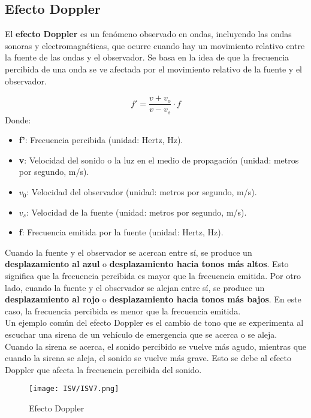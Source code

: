 \documentclass[
	12pt, %
	fleqn, %
	a4paper, %
	oneside, %
]{LegrandOrangeBook}
\begin{document}
\subsection{Efecto Doppler}
El \textbf{efecto Doppler} es un fenómeno observado en ondas, incluyendo las ondas sonoras y electromagnéticas, que ocurre cuando hay un movimiento relativo entre la fuente de las ondas y el observador. Se basa en la idea de que la frecuencia percibida de una onda se ve afectada por el movimiento relativo de la fuente y el observador.\\
\begin{definition}
\begin{equation}
f' = \frac{{v + v_o}}{{v - v_s}} \cdot f
\end{equation}
Donde:
\begin{itemize}
\item \textbf{f'}: Frecuencia percibida (unidad: Hertz, Hz).
\item \textbf{v}: Velocidad del sonido o la luz en el medio de propagación (unidad: metros por segundo, m/s).
\item $v_0$: Velocidad del observador (unidad: metros por segundo, m/s).
\item $v_s$: Velocidad de la fuente (unidad: metros por segundo, m/s).
\item \textbf{f}: Frecuencia emitida por la fuente (unidad: Hertz, Hz).
\end{itemize}
\end{definition}
Cuando la fuente y el observador se acercan entre sí, se produce un \textbf{desplazamiento al azul} o \textbf{desplazamiento hacia tonos más altos}. Esto significa que la frecuencia percibida es mayor que la frecuencia emitida. Por otro lado, cuando la fuente y el observador se alejan entre sí, se produce un \textbf{desplazamiento al rojo} o \textbf{desplazamiento hacia tonos más bajos}. En este caso, la frecuencia percibida es menor que la frecuencia emitida.\\
Un ejemplo común del efecto Doppler es el cambio de tono que se experimenta al escuchar una sirena de un vehículo de emergencia que se acerca o se aleja. Cuando la sirena se acerca, el sonido percibido se vuelve más agudo, mientras que cuando la sirena se aleja, el sonido se vuelve más grave. Esto se debe al efecto Doppler que afecta la frecuencia percibida del sonido.
\begin{figure}[H]
\centering
\texttt{[image: ISV/ISV7.png]}
\caption{Efecto Doppler}
\end{figure}
\end{document}
